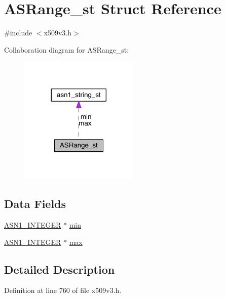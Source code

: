 \hypertarget{struct_a_s_range__st}{}\section{A\+S\+Range\+\_\+st Struct Reference}
\label{struct_a_s_range__st}


{\ttfamily \#include $<$x509v3.\+h$>$}



Collaboration diagram for A\+S\+Range\+\_\+st\+:\nopagebreak
\begin{figure}[H]
\begin{center}
\leavevmode
\includegraphics[width=161pt]{struct_a_s_range__st__coll__graph}
\end{center}
\end{figure}
\subsection*{Data Fields}
\begin{DoxyCompactItemize}
\item 
\hyperlink{crypto_2ossl__typ_8h_af4335399bf9774cb410a5e93de65998b}{A\+S\+N1\+\_\+\+I\+N\+T\+E\+G\+ER} $\ast$ \hyperlink{struct_a_s_range__st_adc933969ce371cc29e36e1967b27800a}{min}
\item 
\hyperlink{crypto_2ossl__typ_8h_af4335399bf9774cb410a5e93de65998b}{A\+S\+N1\+\_\+\+I\+N\+T\+E\+G\+ER} $\ast$ \hyperlink{struct_a_s_range__st_abf4b6674b59fb0fda91d1a2041673b4b}{max}
\end{DoxyCompactItemize}


\subsection{Detailed Description}


Definition at line 760 of file x509v3.\+h.



